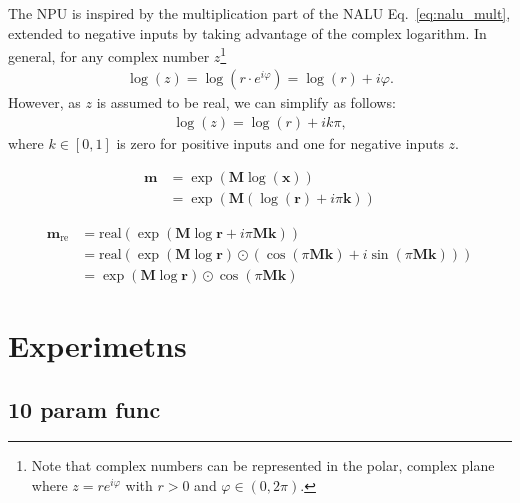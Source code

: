 \documentclass[9pt]{article}
\newcommand{\real}{\text{real}}
\begin{document}
The NPU is inspired by the multiplication part of the NALU
Eq.~\ref{eq:nalu_mult}, extended to negative inputs by taking advantage of the
complex logarithm. In general, for any complex number $z$\footnote{Note that
complex numbers can be represented in the polar, complex plane where
$z=re^{i\varphi}$ with $r>0$ and $\varphi \in (0,2\pi)$.}
\begin{align}
  \log(z) = \log\left(r\cdot e^{i\varphi}\right)
     = \log(r) + i\varphi.
\end{align}
However, as $z$ is assumed to be real, we can simplify as follows:
\begin{align}
  \log(z) = \log(r) + ik\pi,
\end{align}
where $k \in [0,1]$ is zero for positive inputs and one for negative inputs $z$.

\begin{align}
  \bm m &= \exp(\bm M \log(\bm x)) \\
    &= \exp(\bm M ( \log(\bm r) + i\pi\bm k ))
\end{align}

\begin{align}
  \bm m_{\text{re}} &= \real(\exp(\bm M \log \bm r + i\pi\bm M\bm k)) \\
    &= \real(\exp(\bm M \log \bm r) \odot (\cos(\pi \bm M \bm k) + i \sin(\pi \bm M \bm k))) \\
    &= \exp(\bm M \log \bm r) \odot \cos(\pi \bm M \bm k)
\end{align}

\section{Experimetns}%
\label{sec:experimetns}

\subsection{10 param func}%
\label{sub:10_param_func}
\end{document}
